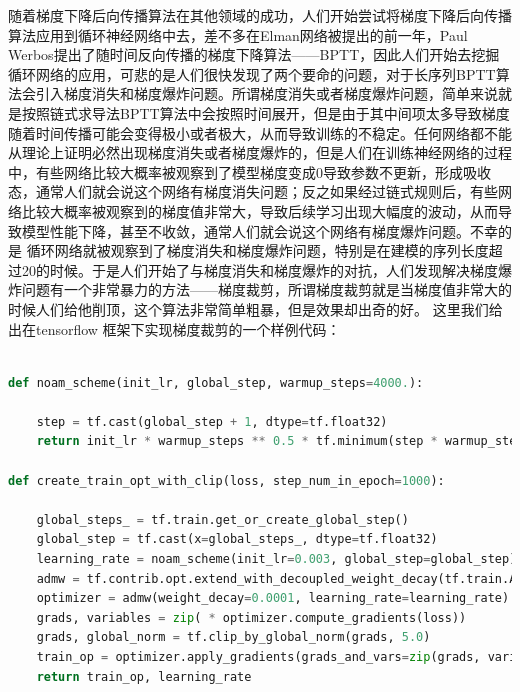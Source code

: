 \documentclass[twoside,a4paper,12pt]{book}%
\begin{document}
随着梯度下降后向传播算法在其他领域的成功，人们开始尝试将梯度下降后向传播算法应用到循环神经网络中去，差不多在Elman网络被提出的前一年，Paul Werbos提出了随时间反向传播的梯度下降算法——BPTT，因此人们开始去挖掘循环网络的应用，可悲的是人们很快发现了两个要命的问题，对于长序列BPTT算法会引入梯度消失和梯度爆炸问题。所谓梯度消失或者梯度爆炸问题，简单来说就是按照链式求导法BPTT算法中会按照时间展开，但是由于其中间项太多导致梯度随着时间传播可能会变得极小或者极大，从而导致训练的不稳定。任何网络都不能从理论上证明必然出现梯度消失或者梯度爆炸的，但是人们在训练神经网络的过程中，有些网络比较大概率被观察到了模型梯度变成0导致参数不更新，形成吸收态，通常人们就会说这个网络有梯度消失问题；反之如果经过链式规则后，有些网络比较大概率被观察到的梯度值非常大，导致后续学习出现大幅度的波动，从而导致模型性能下降，甚至不收敛，通常人们就会说这个网络有梯度爆炸问题。不幸的是
循环网络就被观察到了梯度消失和梯度爆炸问题，特别是在建模的序列长度超过20的时候。于是人们开始了与梯度消失和梯度爆炸的对抗，人们发现解决梯度爆炸问题有一个非常暴力的方法——梯度裁剪，所谓梯度裁剪就是当梯度值非常大的时候人们给他削顶，这个算法非常简单粗暴，但是效果却出奇的好。
这里我们给出在tensorflow 框架下实现梯度裁剪的一个样例代码：
\begin{lstlisting}[language={python}]

def noam_scheme(init_lr, global_step, warmup_steps=4000.):

    step = tf.cast(global_step + 1, dtype=tf.float32)
    return init_lr * warmup_steps ** 0.5 * tf.minimum(step * warmup_steps ** -1.5, step ** -0.5)
    
def create_train_opt_with_clip(loss, step_num_in_epoch=1000):

    global_steps_ = tf.train.get_or_create_global_step()
    global_step = tf.cast(x=global_steps_, dtype=tf.float32)
    learning_rate = noam_scheme(init_lr=0.003, global_step=global_step)
    admw = tf.contrib.opt.extend_with_decoupled_weight_decay(tf.train.AdamOptimizer)
    optimizer = admw(weight_decay=0.0001, learning_rate=learning_rate)
    grads, variables = zip( * optimizer.compute_gradients(loss))
    grads, global_norm = tf.clip_by_global_norm(grads, 5.0)
    train_op = optimizer.apply_gradients(grads_and_vars=zip(grads, variables), global_step=global_steps_)
    return train_op, learning_rate
 \end{lstlisting}
 
\end{document}
